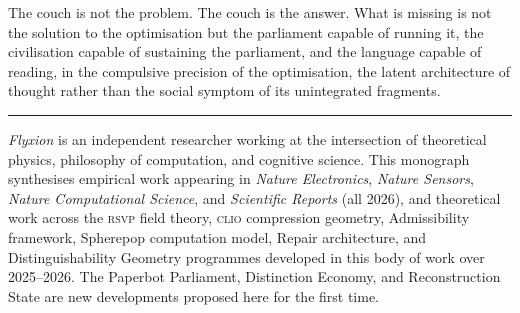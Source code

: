 \documentclass[12pt, letterpaper]{article}
\theoremstyle{remark}
\newcommand{\rsvp}{\textsc{rsvp}}
\newcommand{\clio}{\textsc{clio}}
\begin{document}
The couch is not the problem.  The couch is the answer.  What is missing is
not the solution to the optimisation but the parliament capable of running it,
the civilisation capable of sustaining the parliament, and the language capable
of reading, in the compulsive precision of the optimisation, the latent
architecture of thought rather than the social symptom of its unintegrated
fragments.

\bigskip
\noindent\rule{\textwidth}{0.4pt}
\vspace{0.5em}

\noindent\textit{Flyxion} is an independent researcher working at the
intersection of theoretical physics, philosophy of computation, and cognitive
science.  This monograph synthesises empirical work appearing in
\textit{Nature Electronics}, \textit{Nature Sensors},
\textit{Nature Computational Science}, and \textit{Scientific Reports}
(all 2026), and theoretical work across the \rsvp{} field theory,
\clio{} compression geometry, Admissibility framework, Spherepop computation
model, Repair architecture, and Distinguishability Geometry programmes
developed in this body of work over 2025--2026.  The Paperbot Parliament,
Distinction Economy, and Reconstruction State are new developments proposed
here for the first time.
\end{document}
